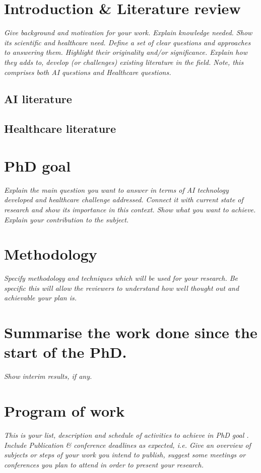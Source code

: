 \section{Introduction \& Literature review}
\emph{Give background and motivation for your work. Explain  knowledge needed. Show its scientific and healthcare need.
Define a set of clear questions and approaches to answering them. Highlight their originality and/or significance. Explain how they adds to, develop (or challenges) existing literature in the field. Note, this comprises both AI questions and Healthcare questions.}
\subsection{AI literature}
\subsection{Healthcare literature}
\section{PhD goal}
\emph{Explain the main question you want to answer in terms of AI technology developed and healthcare challenge addressed. Connect it with current state of research and show its importance in this context.
Show what you want to achieve. Explain your contribution to the subject.}

\section{Methodology}
\emph{Specify methodology and techniques which will be used for your research. Be specific this will allow the reviewers to understand how well thought out and achievable your plan is.}
\section{Summarise the work done since the start of the PhD.}
\emph{Show interim results, if any.}
\section{Program of work}
\emph{This is your list, description and schedule of activities to achieve in PhD goal . Include Publication \& conference deadlines as expected, i.e. Give an overview of subjects or steps of your work you intend to publish,  suggest some meetings or conferences you plan to attend in order to present your research.}


